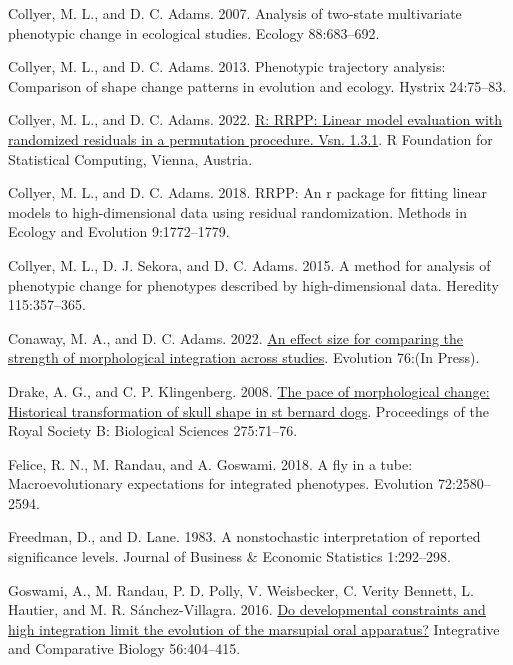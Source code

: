 \documentclass[
  11pt,
]{article}
\newlength{\cslhangindent}
\newlength{\cslentryspacingunit} %
\newenvironment{CSLReferences}[2] %
 {%
  \setlength{\parindent}{0pt}
  \ifodd #1
  \let\oldpar\par
  \def\par{\hangindent=\cslhangindent\oldpar}
  \fi
  \setlength{\parskip}{#2\cslentryspacingunit}
 }%
 {}
\begin{document}
\begin{CSLReferences}{1}{0}
\leavevmode{}%
Collyer, M. L., and D. C. Adams. 2007. Analysis of two-state
multivariate phenotypic change in ecological studies. Ecology
88:683--692.

\leavevmode{}%
Collyer, M. L., and D. C. Adams. 2013. Phenotypic trajectory analysis:
Comparison of shape change patterns in evolution and ecology. Hystrix
24:75--83.

\leavevmode{}%
Collyer, M. L., and D. C. Adams. 2022.
\href{https://CRAN.R-project.org/package=RRPP}{R: RRPP: Linear model
evaluation with randomized residuals in a permutation procedure. Vsn.
1.3.1}. R Foundation for Statistical Computing, Vienna, Austria.

\leavevmode{}%
Collyer, M. L., and D. C. Adams. 2018. RRPP: An r package for fitting
linear models to high-dimensional data using residual randomization.
Methods in Ecology and Evolution 9:1772--1779.

\leavevmode{}%
Collyer, M. L., D. J. Sekora, and D. C. Adams. 2015. A method for
analysis of phenotypic change for phenotypes described by
high-dimensional data. Heredity 115:357--365.

\leavevmode{}%
Conaway, M. A., and D. C. Adams. 2022.
\href{https://doi.org/10.1111/evo.14595}{An effect size for comparing
the strength of morphological integration across studies}. Evolution
76:(In Press).

\leavevmode{}%
Drake, A. G., and C. P. Klingenberg. 2008.
\href{https://doi.org/10.1098/rspb.2007.1169}{The pace of morphological
change: Historical transformation of skull shape in st bernard dogs}.
Proceedings of the Royal Society B: Biological Sciences 275:71--76.

\leavevmode{}%
Felice, R. N., M. Randau, and A. Goswami. 2018. A fly in a tube:
Macroevolutionary expectations for integrated phenotypes. Evolution
72:2580--2594.

\leavevmode{}%
Freedman, D., and D. Lane. 1983. A nonstochastic interpretation of
reported significance levels. Journal of Business {\&} Economic
Statistics 1:292--298.

\leavevmode{}%
Goswami, A., M. Randau, P. D. Polly, V. Weisbecker, C. Verity Bennett,
L. Hautier, and M. R. Sánchez-Villagra. 2016.
\href{https://doi.org/10.1093/icb/icw039}{Do developmental constraints
and high integration limit the evolution of the marsupial oral
apparatus?} Integrative and Comparative Biology 56:404--415.


\end{CSLReferences}
\end{document}
